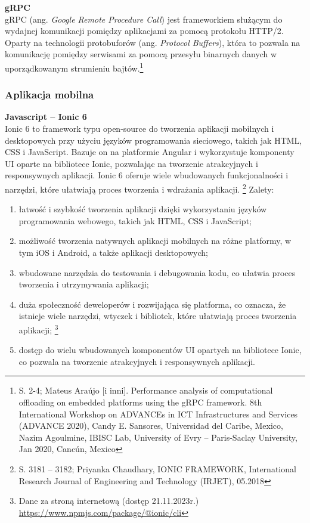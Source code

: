 \documentclass[12pt, a4paper, twoside, openany]{book}
\newcommand{\forceindent}{\leavevmode{\parindent=1.3em\indent}}
\begin{document}
\forceindent \textbf{gRPC\\}
\forceindent gRPC (ang. \textit{Google Remote Procedure Call}) jest frameworkiem służącym do wydajnej komunikacji pomiędzy aplikacjami za pomocą protokołu HTTP/2. Oparty na technologii protobuforów (ang. \textit{Protocol Buffers}), która to pozwala na komunikację pomiędzy serwisami za pomocą przesyłu binarnych danych w uporządkowanym strumieniu bajtów.\footnote{S. 2-4; Mateus Araújo [i inni]. Performance analysis of computational offloading on embedded platforms using the gRPC framework. 8th International Workshop on ADVANCEs in ICT Infrastructures and Services (ADVANCE 2020), Candy E. Sansores, Universidad del Caribe, Mexico, Nazim Agoulmine, IBISC Lab, University of Evry -- Paris-Saclay University, Jan 2020, Cancún, Mexico}

\subsubsection{Aplikacja mobilna}

\forceindent \textbf{Javascript -- Ionic 6\\}
\indent Ionic 6 to framework typu open-source do tworzenia aplikacji mobilnych i desktopowych przy użyciu języków programowania sieciowego, takich jak HTML, CSS i JavaScript. Bazuje on na platformie Angular i wykorzystuje komponenty UI oparte na bibliotece Ionic, pozwalając na tworzenie atrakcyjnych i responsywnych aplikacji. Ionic 6 oferuje wiele wbudowanych funkcjonalności i narzędzi, które ułatwiają proces tworzenia i wdrażania aplikacji. \footnote{S. 3181 -- 3182; Priyanka Chaudhary, IONIC FRAMEWORK, International Research Journal of Engineering and Technology (IRJET), 05.2018}
Zalety:
\begin{enumerate}[label=--]
    \item łatwość i szybkość tworzenia aplikacji dzięki wykorzystaniu języków programowania webowego, takich jak HTML, CSS i JavaScript;
    \item możliwość tworzenia natywnych aplikacji mobilnych na różne platformy, w tym iOS i Android, a także aplikacji desktopowych;
    \item wbudowane narzędzia do testowania i debugowania kodu, co ułatwia proces tworzenia i utrzymywania aplikacji;
    \item duża społeczność deweloperów i rozwijająca się platforma, co oznacza, że istnieje wiele narzędzi, wtyczek i bibliotek, które ułatwiają proces tworzenia aplikacji; \footnote{Dane za stroną internetową (dostęp 21.11.2023r.) \url{https://www.npmjs.com/package/@ionic/cli}}
    \item dostęp do wielu wbudowanych komponentów UI opartych na bibliotece Ionic, co pozwala na tworzenie atrakcyjnych i responsywnych aplikacji.
\end{enumerate}
\end{document}
